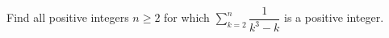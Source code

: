 Find all positive integers $n\ge2$ for which $\displaystyle\sum_{k=2}^n\dfrac1{k^3-k}$ is a positive integer.
